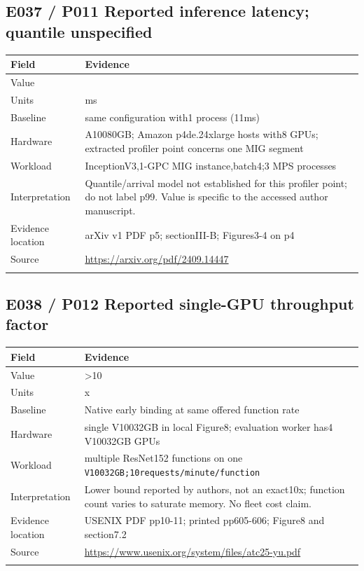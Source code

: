 \subsection*{E037 / P011 Reported inference latency; quantile unspecified}

\begin{longtable}{>{\raggedright\arraybackslash}p{}>{\raggedright\arraybackslash}p{}}
\toprule
\textbf{Field} & \textbf{Evidence}\\\midrule\endhead
Value & 27\\\addlinespace
Units & ms\\\addlinespace
Baseline & same configuration with1 process (11ms)\\\addlinespace
Hardware & A10080GB; Amazon p4de.24xlarge hosts with8 GPUs; extracted profiler point concerns one MIG segment\\\addlinespace
Workload & InceptionV3,1-GPC MIG instance,batch4;3 MPS processes\\\addlinespace
Interpretation & Quantile/arrival model not established for this profiler point; do not label p99. Value is specific to the accessed author manuscript.\\\addlinespace
Evidence location & arXiv v1 PDF p5; sectionIII-B; Figures3-4 on p4\\\addlinespace
Source & \url{https://arxiv.org/pdf/2409.14447}\\\addlinespace
\bottomrule\end{longtable}

\subsection*{E038 / P012 Reported single-GPU throughput factor}

\begin{longtable}{>{\raggedright\arraybackslash}p{}>{\raggedright\arraybackslash}p{}}
\toprule
\textbf{Field} & \textbf{Evidence}\\\midrule\endhead
Value & >10\\\addlinespace
Units & x\\\addlinespace
Baseline & Native early binding at same offered function rate\\\addlinespace
Hardware & single V10032GB in local Figure8; evaluation worker has4 V10032GB GPUs\\\addlinespace
Workload & multiple ResNet152 functions on one \nolinkurl{V10032GB;10requests/minute/function}\\\addlinespace
Interpretation & Lower bound reported by authors, not an exact10x; function count varies to saturate memory. No fleet cost claim.\\\addlinespace
Evidence location & USENIX PDF pp10-11; printed pp605-606; Figure8 and section7.2\\\addlinespace
Source & \url{https://www.usenix.org/system/files/atc25-yu.pdf}\\\addlinespace
\bottomrule\end{longtable}

